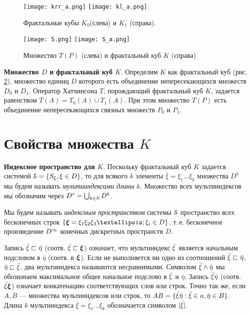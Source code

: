 \begin{figure}[H]
\centering
\qquad
\texttt{[image: krr\_a.png]}
\hfill
\texttt{[image: kl\_a.png]}
\qquad
\caption{Фрактальные кубы $K_0$(слева)  и  $K_1$ (справа).}
\label{fig:5_2}
\end{figure}

\begin{figure}[H]
\centering
\qquad
\texttt{[image: S.png]}
\hfill
\texttt{[image: S\_a.png]}
\qquad
\caption{Множество $T(P)$ (слева)  и фрактальный куб $K$ (справа)}
\label{fig:5_3}
\end{figure}

{\bf Множество $ D$ и фрактальный куб $K$}.  
Определим $K$ как фрактальный куб (рис. \ref{fig:5_3}), множество единиц $D$ которого есть объединение непересекающихся множеств $D_0$  и  $D_1$. 
Оператор Хатчинсона $T$, порождающий фрактальный куб $K$, задается равенством $T(A)=T_0(A)\cup T_1(A)$. 
При этом множество $T(P)$ есть объединение непересекающихся связных множеств $P_0$  и $P_1$.



\section{Свойства множества $K$}

{\bf Индексное пространство для $K$}.
Поскольку фрактальный куб $K$ задается системой ${\EuScript S}=\{S_\xi, \xi\in D\}$, то
для всякого $k$ элементы $\bar\xi=\xi_1\ldots\xi_k$ множества $ D^k$ мы будем называть {\it мультииндексами длины} $k$.
Множество всех мультииндексов мы обозначим через $ D^*=\bigcup_{k\in\mathbb{N}} D^k$.

Мы будем называть {\em индексным пространством} системы ${\EuScript S}$  пространство всех бесконечных строк  $\{\bmx=\xi_1\xi_2\xi_3…;\xi_i\in  D\}$, т.\,е. бесконечное произведение $D^\infty$ конечных дискретных пространств $D$.

Запись ${\bar{\xi}}\sqsubset \bar\eta$ (соотв. ${\bar{\xi}}\sqsubset {\bm{\xi}}$) означает, что мультииндекс ${\bar{\xi}}$ является начальным подсловом в $\bar\eta$ (соотв. в ${\bm{\xi}}$).
Если не выполняется ни одно из соотношений ${\bar{\xi}}\sqsubset \bar\eta$, $ \bar\eta\sqsubset{\bar{\xi}}$, два мультииндекса называются несравнимыми. 
Символом ${\bar{\xi}}\wedge \bar\eta$ мы обозначаем максимальное общее начальное подслово в ${\bar{\xi}}$  и  $\bar\eta$. 
Запись ${\bar{\xi}}\bar\eta$ (соотв. ${\bar{\xi}}{\bm{\xi}}$) означает конкатенацию соответствующих слов или строк. 
Точно так же, если $A,B$ --- множества мультииндексов или строк, то $AB=\{{\bar{\xi}}\bar\eta: {\bar{\xi}}\in a,\bar\eta\in B\}$.   
Длина $k$ мультииндекса $\bar\xi=\xi_1\ldots\xi_k$ обозначается символом $|{\bar{\xi}}|$.

